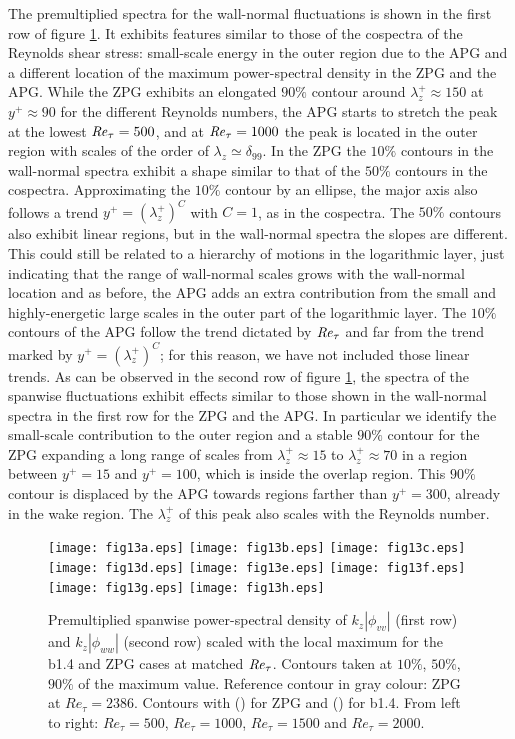 The premultiplied spectra for the wall-normal fluctuations is shown in the first row of figure \ref{fig:spec1D_VV_WW}. It exhibits features similar to those of the cospectra of the Reynolds shear stress: small-scale energy in the outer region due to the APG and a different location of the maximum power-spectral density in the ZPG and the APG. While the ZPG exhibits an elongated $90\%$ contour around $\lambda_z^+ \approx 150$ at $y^+\approx 90$ for the different Reynolds numbers, the APG starts to stretch the peak at the lowest $\mbox{\textit{Re}}_{\tau}=500$, and at $\mbox{\textit{Re}}_{\tau}=1000$ the peak is located in the outer region with scales of the order of $\lambda_z \simeq \delta_{99}$.
In the ZPG the $10\%$ contours in the wall-normal spectra exhibit a shape similar to that of the $50\%$ contours in the cospectra. Approximating the $10\%$ contour by an ellipse, the major axis also follows a trend $y^+=(\lambda_z^+)^C$ with $C=1$, as in the cospectra. The $50\%$ contours also exhibit linear regions, but in the wall-normal spectra the slopes are different. This could still be related to a hierarchy of motions in the logarithmic layer, just indicating that the range of wall-normal scales grows with the wall-normal location and as before, the APG adds an extra contribution from the small and highly-energetic large scales in the outer part of the logarithmic layer. The $10\%$ contours of the APG follow the trend dictated by $\mbox{\textit{Re}}_{\tau}$ and far from the trend marked by $y^+=(\lambda_z^+)^C$; for this reason, we have not included those linear trends.
As can be observed in the second row of figure \ref{fig:spec1D_VV_WW}, the spectra of the spanwise fluctuations exhibit effects similar to those shown in the wall-normal spectra in the first row for the ZPG and the APG. In particular we identify the small-scale contribution to the outer region and a stable $90\%$ contour for the ZPG expanding a long range of scales from $\lambda_z^+\approx 15$ to $\lambda_z^+\approx 70$ in a region between $y^+=15$ and $y^+=100$, which is inside the overlap region. This $90\%$ contour is displaced by the APG towards regions farther than $y^+=300$, already in the wake region. The $\lambda_z^+$ of this peak also scales with the Reynolds number.

\begin{figure}
\texttt{[image: fig13a.eps]}
\texttt{[image: fig13b.eps]}
\texttt{[image: fig13c.eps]}
\texttt{[image: fig13d.eps]}
\texttt{[image: fig13e.eps]}
\texttt{[image: fig13f.eps]}
\texttt{[image: fig13g.eps]}
\texttt{[image: fig13h.eps]}
  \caption{Premultiplied spanwise power-spectral density of $k_z |\phi_{vv}|$ (first row) and $k_z |\phi_{ww}|$ (second row) scaled with the local maximum for the b1.4 and ZPG cases at matched $\mbox{\textit{Re}}_{\tau}$. Contours taken at $10\%$, $50\%$, $90\%$ of the maximum value. Reference contour in gray colour: ZPG at $Re_{\tau}=2386$. Contours with (\protect\blackline) for ZPG and (\protect\orangeline) for b1.4. From left to right: $Re_{\tau}=500$, $Re_{\tau}=1000$, $Re_{\tau}=1500$ and $Re_{\tau}=2000$.}
\label{fig:spec1D_VV_WW}
\end{figure}

